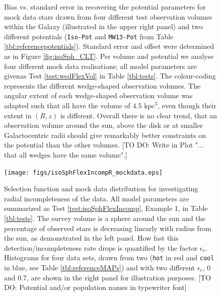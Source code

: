 



\begin{figure}[p]
\caption{Bias vs. standard error in recovering the potential parameters for mock data stars drawn from four different test observation volumes within the Galaxy (illustrated in the upper right panel) and two different potentials (\texttt{Iso-Pot} and \texttt{MW13-Pot} from Table \ref{tbl:referencepotentials}). Standard error and offset were determined as in Figure \ref{fig:isoSph_CLT}. Per volume and potential we analyse four different mock data realisations; all model parameters are givenas Test \ref{test:wedFlexVol} in Table \ref{tbl:tests}. The colour-coding represents the different wedge-shaped observation volumes. The angular extent of each wedge-shaped observation volume was adapted such that all have the volume of $4.5 \text{ kpc}^3$, even though their extent in $(R,z)$ is different.  Overall there is no clear trend, that an observation volume around the sun, above the disk or at smaller Galactocentric radii should give remarkably better constraints on the potential than the other volumes. [TO DO: Write in Plot "... that all wedges have the same volume".]}
\label{fig:wedFlexVol_bias_vs_SE}
\end{figure}




\begin{figure}
\texttt{[image: figs/isoSphFlexIncompR\_mockdata.eps]}
\caption{Selection function and mock data distribution for investigating radial incompleteness of the data. All model parameters are summarized as Test \ref{test:isoSphFlexIncomp}, Example 1, in Table \ref{tbl:tests}. The survey volume is a sphere around the sun and the percentage of observed stars is decreasing linearly with radius from the sun, as demonstrated in the left panel. How fast this detection/incompleteness rate drops is quantified by the factor $\epsilon_r$. Histograms for four data sets, drawn from two \MAPs{} (\texttt{hot} in red and \texttt{cool} in blue, see Table \ref{tbl:referenceMAPs}) and with two different $\epsilon_r$, 0 and 0.7, are shown in the right panel for illustration purposes. [TO DO: Potential and/or population names in typewriter font]} 
\label{fig:isoSphFlexIncompR_mockdata}
\end{figure}

